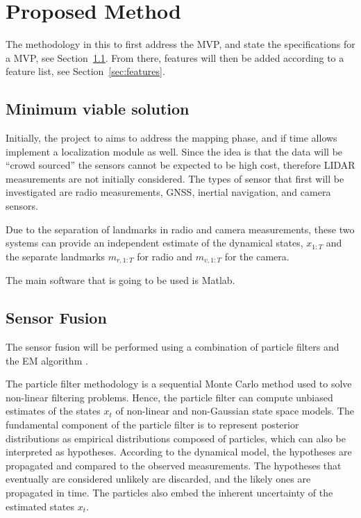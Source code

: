 \section{Proposed Method}

The methodology in this to first address the \gls{MVP}, and state the
specifications for a \gls{MVP}, see Section~\ref{sec:mvs}. From there, features
will then be added
according to a feature list, see Section~\ref{sec:features}.

\subsection{Minimum viable solution}\label{sec:mvs}

Initially, the project to aims to address the mapping phase, and if time allows
implement a localization module as well. Since the idea is that the data will
be ``crowd sourced'' the sensors cannot be expected to be high cost, therefore
\gls{LIDAR} measurements are not initially considered. The types of sensor that
first will be investigated are radio measurements, \gls{GNSS}, inertial
navigation, and camera sensors.

Due to the separation of landmarks in radio and camera measurements, these two
systems can provide an independent estimate of the dynamical states, $x_{1:T}$
and the separate landmarks $m_{r,1:T}$ for radio and $m_{v,1:T}$ for the
camera.

The main software that is going to be used is Matlab.

\subsection{Sensor Fusion}

The sensor fusion will be performed using a combination of particle
filters and the \gls{EM} algorithm
\cite{DBLP:journals/automatica/SchonWN11}.

The particle filter
\cite{210672} methodology is a sequential Monte Carlo method used to
solve non-linear filtering problems. Hence, the particle filter can
compute unbiased estimates of the
states $x_{t}$  of non-linear and non-Gaussian state space models. The
fundamental component of the particle filter is to represent posterior
distributions as empirical distributions composed of particles, which
can also be interpreted as hypotheses. According to the dynamical
model, the hypotheses are propagated and
compared to the observed measurements. The hypotheses that eventually
are considered unlikely are discarded, and the likely ones are
propagated in time. The particles also embed the inherent uncertainty
of the estimated states $x_t$.

